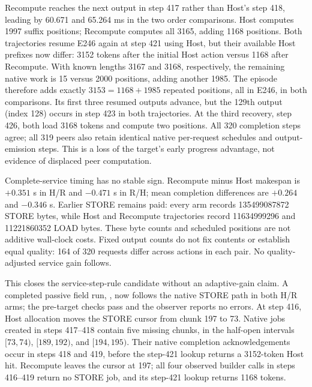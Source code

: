 \documentclass[10pt,a4paper]{article}
\begin{document}
Recompute reaches the next output in step 417 rather than Host's step 418,
leading by 60.671 and 65.264 ms in the two order comparisons. Host computes
1997 suffix positions; Recompute computes all 3165, adding 1168 positions.
Both trajectories resume E246 again at step 421 using Host, but their available
Host prefixes now differ: 3152 tokens after the initial Host action versus
1168 after Recompute. With known lengths 3167 and 3168, respectively, the
remaining native work is 15 versus 2000 positions, adding another 1985.
The episode therefore adds exactly $3153=1168+1985$ repeated positions, all
in E246, in both comparisons. Its first three resumed outputs advance, but
the 129th output (index 128) occurs in step 423 in both trajectories. At the
third recovery, step 426, both load 3168 tokens and compute two positions.
All 320 completion steps agree; all 319 peers also retain identical native
per-request schedules and output-emission steps. This is a loss of the target's
early progress advantage, not evidence of displaced peer computation.

Complete-service timing has no stable sign. Recompute minus Host makespan is
$+0.351$ s in H/R and $-0.471$ s in R/H; mean completion differences are
$+0.264$ and $-0.346$ s. Earlier STORE remains paid: every arm records
135499087872 STORE bytes, while Host and Recompute trajectories record
11634999296 and 11221860352 LOAD bytes. These byte counts and scheduled
positions are not additive wall-clock costs. Fixed output counts do not fix
contents or establish equal quality: 164 of 320 requests differ across actions
in each pair. No quality-adjusted service gain follows.

This closes the service-step-rule candidate without an adaptive-gain claim.
A completed passive field run, , now follows
the native STORE path in both H/R arms; the pre-target checks pass and the
observer reports no errors. At step 416, Host allocation moves the STORE cursor
from chunk 197 to 73. Native jobs created in steps 417--418 contain five
missing chunks, in the half-open intervals $[73,74)$, $[189,192)$, and
$[194,195)$. Their native completion acknowledgements occur in steps 418 and
419, before the step-421 lookup returns a 3152-token Host hit. Recompute leaves
the cursor at 197; all four observed builder calls in steps 416--419 return no
STORE job, and its step-421 lookup returns 1168 tokens.
\end{document}
